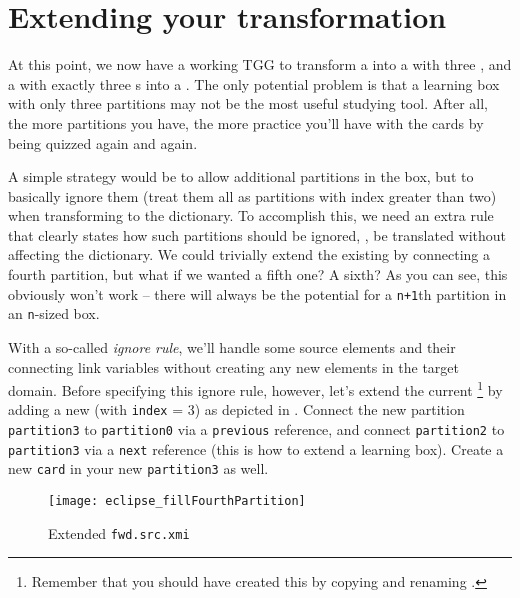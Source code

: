 \section{Extending your transformation}
\genHeader

At this point, we now have a working TGG to transform a  into a  with three , and a  with exactly three s into a . 
The only potential problem is that a learning box with only three partitions may not be the most useful studying tool. 
After all, the more partitions you have, the more practice you'll have with the cards by being quizzed again and again.

A simple strategy would be to allow additional partitions in the box, but to basically ignore them (treat them all as partitions with index greater than two) when transforming to the dictionary. 
To accomplish this, we need an extra rule that clearly states how such partitions should be ignored, \idest, be translated without affecting the dictionary. 
We could trivially extend the existing  by connecting a fourth partition, but what if we wanted a fifth one? A sixth? As you can see, this obviously won't work -- there will always be the potential for a \texttt{n+1}th partition in an \texttt{n}-sized box. 

With a so-called \emph{ignore rule}, we'll handle some source elements and their connecting link variables without creating any new elements in the target domain.
%
Before specifying this ignore rule, however, let's extend the current \footnote{Remember that you should have created this by copying and renaming .} by adding a new  (with \texttt{index} = 3) as depicted in .
Connect the new partition \texttt{partition3}  to \texttt{partition0} via a \texttt{previous} reference, and connect \texttt{partition2} to \texttt{partition3} via a \texttt{next} reference (this is how to extend a learning box).
Create a new \texttt{card} in your new \texttt{partition3} as well.

\begin{figure}[htbp]
\begin{center}
  \texttt{[image: eclipse\_fillFourthPartition]}
  \caption{Extended \texttt{fwd.src.xmi}}
  \label{fig:ea_extended_fwd_src_xmi}
\end{center}
\end{figure}



